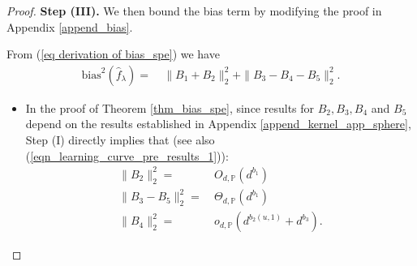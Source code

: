 \documentclass{article}
\theoremstyle{plain}
\theoremstyle{definition}
\theoremstyle{remark}
\begin{document}
\begin{appendix}
\begin{proof}
{\bf Step (III). } We then bound the bias term by modifying the proof in Appendix \ref{append_bias}.

From (\ref{eq derivation of bias_spe}) we have
\begin{equation*}
\begin{aligned}
    \mathrm{bias}^{2}(\hat{f}_{\lambda})  =  &~
    \|B_1+B_2\|_{2}^{2} + \|B_3-B_4-B_5\|_{2}^{2}.
\end{aligned} 
\end{equation*}

\begin{itemize}
    \item In the proof of Theorem \ref{thm_bias_spe}, since results for $B_2, B_3, B_4$ and $B_5$ depend on the results established in Appendix \ref{append_kernel_app_sphere}, Step (I) directly implies that (see also (\ref{eqn_learning_curve_pre_results_1})):
    \begin{equation*}
    \begin{aligned}
                \|B_2\|_{2}^{2} =&~ 
            O_{d, \mathbb{P}}\left(  d^{b_1}\right)\\
            \|B_3-B_5\|_{2}^{2} 
        =&~
        \Theta_{d, \mathbb{P}} \left( d^{b_1}\right)\\
        \|B_4\|_{2}^{2} =&~ o_{d, \mathbb{P}} \left(d^{b_2(u, 1)}+d^{b_3}\right).
    \end{aligned}
\end{equation*}


\end{itemize}
\end{proof}
\end{appendix}
\end{document}
